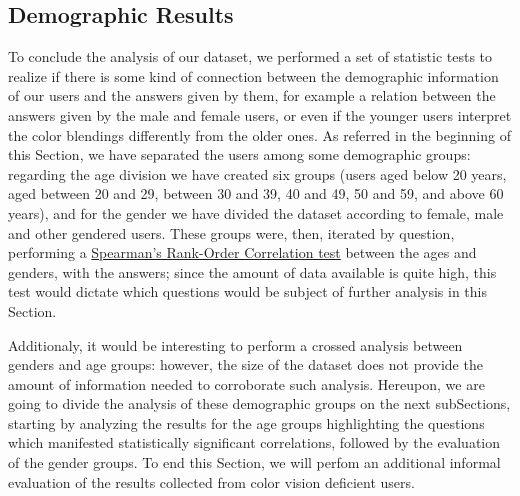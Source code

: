 \subsection{Demographic Results}
\label{subsec:results_demographic}
%
To conclude the analysis of our dataset, we performed a set of statistic tests to realize if there is some kind of connection between the demographic information of our users and the answers given by them, for example a relation between the answers given by
the male and female users, or even if the younger users interpret the color blendings differently from the older ones. As referred in the beginning of this Section, we have separated the users among some demographic groups: regarding the age division we have
created six groups (users aged below 20 years, aged between 20 and 29, between 30 and 39, 40 and 49, 50 and 59, and above 60 years), and for the gender we have divided the dataset according to female, male and other gendered users. These groups were, then, iterated
by question, performing a \ul{Spearman's Rank-Order Correlation test} between the ages and genders, with the answers; since the amount of data available is quite high, this test would dictate which questions would be subject of further analysis in this Section. \par
%
Additionaly, it would be interesting to perform a crossed analysis between genders and age groups: however, the size of the dataset does not provide the amount of information needed to corroborate such analysis. Hereupon, we are going to divide the analysis of these demographic
groups on the next subSections, starting by analyzing the results for the age groups highlighting the questions which manifested statistically significant correlations, followed by the evaluation of the gender groups. To end this Section, we will perfom an additional
informal evaluation of the results collected from color vision deficient users.
%
